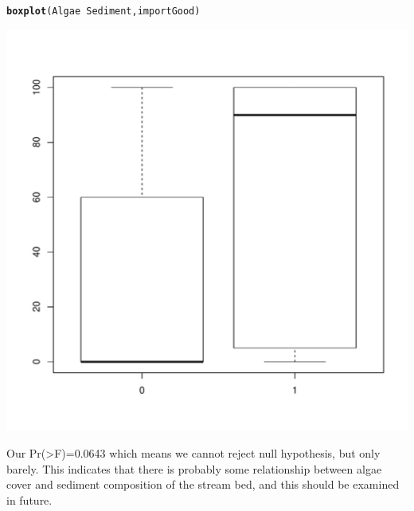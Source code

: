 \documentclass{article}\usepackage[]{graphicx}\usepackage[]{color}
\makeatletter
\def\maxwidth{ %
  \ifdim\Gin@nat@width>\linewidth
    \linewidth
  \else
    \Gin@nat@width
  \fi
}
\newcommand{\hlopt}[1]{\textcolor[rgb]{0,0,0}{#1}}%
\newcommand{\hlstd}[1]{\textcolor[rgb]{0.345,0.345,0.345}{#1}}%
\newcommand{\hlkwd}[1]{\textcolor[rgb]{0.737,0.353,0.396}{\textbf{#1}}}%
\newenvironment{kframe}{%
 \def\at@end@of@kframe{}%
 \ifinner\ifhmode%
  \def\at@end@of@kframe{\end{minipage}}%
  \begin{minipage}{\columnwidth}%
 \fi\fi%
 \def\FrameCommand##1{\hskip\@totalleftmargin \hskip-\fboxsep
 \colorbox{shadecolor}{##1}\hskip-\fboxsep
     \hskip-\linewidth \hskip-\@totalleftmargin \hskip\columnwidth}%
 \MakeFramed {\advance\hsize-\width
   \@totalleftmargin\z@ \linewidth\hsize
   \@setminipage}}%
 {\par\unskip\endMakeFramed%
 \at@end@of@kframe}
\newenvironment{knitrout}{}{} %
\makeatother
\begin{document}
\begin{knitrout}
\color{fgcolor}\begin{kframe}
\begin{alltt}
\hlkwd{boxplot}\hlstd{(Algae}\hlopt{~}\hlstd{Sediment,importGood)}
\end{alltt}
\end{kframe}
\includegraphics[width=\maxwidth]{figure/unnamed-chunk-10-1} 

\end{knitrout}
Our Pr(>F)=0.0643 which means we cannot reject null hypothesis, but only barely. This indicates that there is probably some relationship between algae cover and sediment composition of the stream bed, and this should be examined in future.
\end{document}
